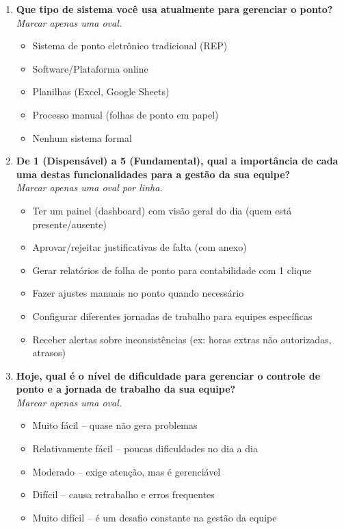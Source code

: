 \begin{apendicesenv}
\begin{enumerate}
  \item \textbf{Que tipo de sistema você usa atualmente para gerenciar o ponto?} \\
        \textit{Marcar apenas uma oval.}
        \begin{itemize}
          \item Sistema de ponto eletrônico tradicional (REP)
          \item Software/Plataforma online
          \item Planilhas (Excel, Google Sheets)
          \item Processo manual (folhas de ponto em papel)
          \item Nenhum sistema formal
        \end{itemize}

  \item \textbf{De 1 (Dispensável) a 5 (Fundamental), qual a importância de cada uma destas funcionalidades para a gestão da sua equipe?} \\
        \textit{Marcar apenas uma oval por linha.}
        \begin{itemize}
          \item Ter um painel (dashboard) com visão geral do dia (quem está presente/ausente)
          \item Aprovar/rejeitar justificativas de falta (com anexo)
          \item Gerar relatórios de folha de ponto para contabilidade com 1 clique
          \item Fazer ajustes manuais no ponto quando necessário
          \item Configurar diferentes jornadas de trabalho para equipes específicas
          \item Receber alertas sobre inconsistências (ex: horas extras não autorizadas, atrasos)
        \end{itemize}

  \item \textbf{Hoje, qual é o nível de dificuldade para gerenciar o controle de ponto e a jornada de trabalho da sua equipe?} \\
        \textit{Marcar apenas uma oval.}
        \begin{itemize}
          \item Muito fácil – quase não gera problemas
          \item Relativamente fácil – poucas dificuldades no dia a dia
          \item Moderado – exige atenção, mas é gerenciável
          \item Difícil – causa retrabalho e erros frequentes
          \item Muito difícil – é um desafio constante na gestão da equipe
        \end{itemize}


\end{enumerate}
\end{apendicesenv}
